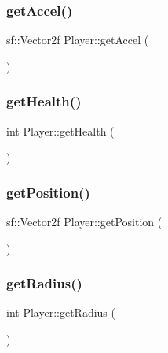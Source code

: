 \subsubsection{\texorpdfstring{get\+Accel()}{getAccel()}}
{\footnotesize\ttfamily sf\+::\+Vector2f Player\+::get\+Accel (\begin{DoxyParamCaption}{ }\end{DoxyParamCaption})}

\mbox{\label{class_player_abcb15d249bed9a4ab0ab86b52b0d747a}} 
\subsubsection{\texorpdfstring{get\+Health()}{getHealth()}}
{\footnotesize\ttfamily int Player\+::get\+Health (\begin{DoxyParamCaption}{ }\end{DoxyParamCaption})}

\mbox{\label{class_player_a23356f99a9de86d3d47eadb679b332dc}} 
\subsubsection{\texorpdfstring{get\+Position()}{getPosition()}}
{\footnotesize\ttfamily sf\+::\+Vector2f Player\+::get\+Position (\begin{DoxyParamCaption}{ }\end{DoxyParamCaption})}

\mbox{\label{class_player_a96b2c2aa27ba5d756b12fddb2a841cc8}} 
\subsubsection{\texorpdfstring{get\+Radius()}{getRadius()}}
{\footnotesize\ttfamily int Player\+::get\+Radius (\begin{DoxyParamCaption}{ }\end{DoxyParamCaption})}

\mbox{\label{class_player_a5aaef7be6b70ec6069a861add36b5e2c}} 
